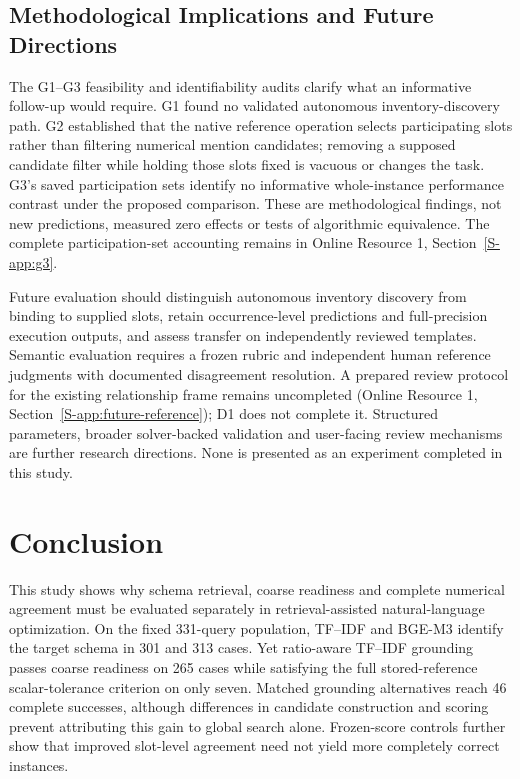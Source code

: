 \documentclass[pdflatex,iicol,sn-basic,Numbered]{sn-jnl}
\begin{document}
\subsection{Methodological Implications and Future Directions}
\label{subsec:future_work}\label{subsec:closed-audits}
The G1--G3 feasibility and identifiability audits clarify what an informative follow-up would require. G1 found no validated autonomous inventory-discovery path. G2 established that the native reference operation selects participating slots rather than filtering numerical mention candidates; removing a supposed candidate filter while holding those slots fixed is vacuous or changes the task. G3's saved participation sets identify no informative whole-instance performance contrast under the proposed comparison. These are methodological findings, not new predictions, measured zero effects or tests of algorithmic equivalence. The complete participation-set accounting remains in Online Resource 1, Section~\ref{S-app:g3}.

Future evaluation should distinguish autonomous inventory discovery from binding to supplied slots, retain occurrence-level predictions and full-precision execution outputs, and assess transfer on independently reviewed templates. Semantic evaluation requires a frozen rubric and independent human reference judgments with documented disagreement resolution. A prepared review protocol for the existing relationship frame remains uncompleted (Online Resource 1, Section~\ref{S-app:future-reference}); D1 does not complete it. Structured parameters, broader solver-backed validation and user-facing review mechanisms are further research directions. None is presented as an experiment completed in this study.

\section{Conclusion}
\label{sec:conclusion}
This study shows why schema retrieval, coarse readiness and complete numerical agreement must be evaluated separately in retrieval-assisted natural-language optimization. On the fixed 331-query population, TF--IDF and BGE-M3 identify the target schema in 301 and 313 cases. Yet ratio-aware TF--IDF grounding passes coarse readiness on 265 cases while satisfying the full stored-reference scalar-tolerance criterion on only seven. Matched grounding alternatives reach 46 complete successes, although differences in candidate construction and scoring prevent attributing this gain to global search alone. Frozen-score controls further show that improved slot-level agreement need not yield more completely correct instances.
\end{document}
